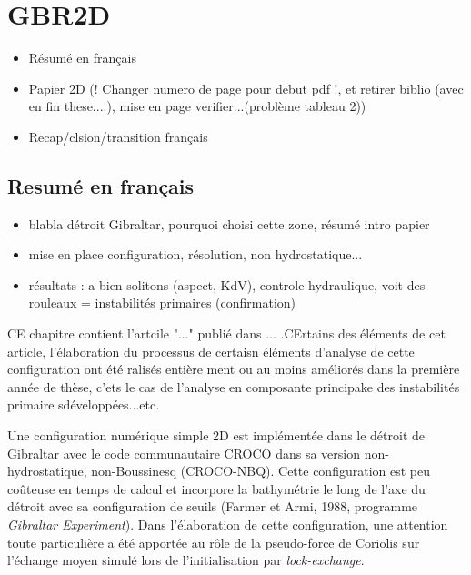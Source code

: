 \documentclass[a4paper,12pt,notitlepage]{report}
\numberwithin{equation}{section}
\begin{document}


%


\chapter{GBR2D}
\begin{itemize}
\item R\'esum\'e en français
\item Papier 2D (! Changer numero de page pour debut pdf !, et retirer biblio (avec en fin these....), mise en page verifier...(problème tableau 2))
\item Recap/clsion/transition français
\end{itemize}

\section{Resumé en français}
\begin{itemize}
\item blabla détroit Gibraltar, pourquoi choisi cette zone, résumé intro papier
\item mise en place configuration, résolution, non hydrostatique...
\item résultats : a bien solitons (aspect, KdV), controle hydraulique, voit des rouleaux = instabilités primaires (confirmation)
\end{itemize}

CE chapitre contient l'artcile "..." publié dans ... .CErtains des éléments de cet article, l'élaboration du processus de 
certaisn éléments d'analyse de cette configuration ont été ralisés entière ment ou au moins améliorés dans la première année de thèse, c'ets le cas de l'analyse en composante principake des instabilités primaire sdéveloppées...etc.


Une configuration numérique simple 2D est implémentée dans le détroit de Gibraltar avec le code communautaire CROCO dans sa version non-hydrostatique, non-Boussinesq (CROCO-NBQ). Cette configuration est peu coûteuse en temps de calcul et incorpore la bathymétrie le long de l'axe du détroit avec sa configuration de seuils (Farmer et Armi, 1988, programme \textit{Gibraltar Experiment}). Dans l'élaboration de cette configuration, une attention toute particulière a été apportée au rôle de la pseudo-force de Coriolis sur l'échange moyen simulé lors de l'initialisation par \textit{lock-exchange}.\\
\end{document}
